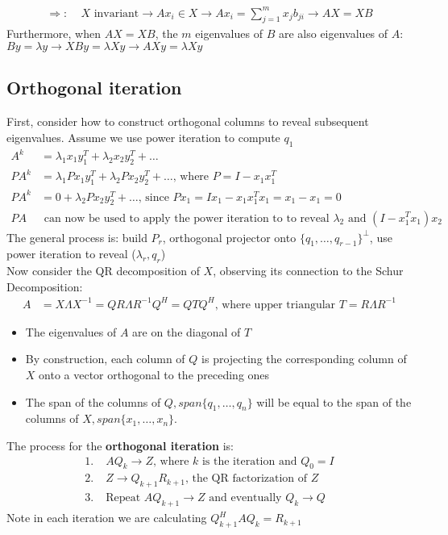 \documentclass{article}
\begin{document}
\begin{align*}
    \Rightarrow: \;& X \textrm{ invariant} \longrightarrow Ax_i \in X \longrightarrow Ax_i = \sum_{j=1}^mx_jb_{ji} \longrightarrow AX = XB
\end{align*}
Furthermore, when $AX = XB$, the $m$ eigenvalues of $B$ are also eigenvalues of $A$: $By = \lambda y \longrightarrow XBy = \lambda Xy \longrightarrow AXy = \lambda Xy$

\subsection{Orthogonal iteration}
First, consider how to construct orthogonal columns to reveal subsequent eigenvalues. Assume we use power iteration to compute $q_1$
\begin{align*}
    A^k &= \lambda_1x_1y_1^T + \lambda_2x_2y_2^T + \dots\\
    PA^k &= \lambda_1Px_1y_1^T + \lambda_2Px_2y_2^T + \dots \textrm{, where } P = I - x_1x_1^T\\
    PA^k &= 0 + \lambda_2Px_2y_2^T + \dots \textrm{, since } Px_1 = Ix_1 - x_1x_1^Tx_1 = x_1 - x_1 = 0\\
    PA &\textrm{ can now be used to apply the power iteration to to reveal $\lambda_2$ and } (I - x_1^Tx_1)x_2
\end{align*}
The general process is: build $P_r$, orthogonal projector onto  $\{q_1, \dots, q_{r-1}\}^\perp$, use power iteration to reveal ($\lambda_r, q_r$)\\
Now consider the QR decomposition of $X$, observing its connection to the Schur Decomposition:
\begin{align*}
    A &= X\Lambda X^{-1} = QR \Lambda R^{-1} Q^H = QTQ^H \textrm{, where upper triangular } T = R\Lambda R^{-1}
\end{align*}
\begin{itemize}
    \item The eigenvalues of $A$ are on the diagonal of $T$
    \item By construction, each column of $Q$ is projecting the corresponding column of $X$ onto a vector orthogonal to the preceding ones
    \item The span of the columns of $Q, span\{q_1, \dots, q_n\}$ will be equal to the span of the columns of $X, span\{x_1, \dots, x_n\}$.
\end{itemize}
The process for the \textbf{orthogonal iteration} is:
\begin{align*}
    1. \;& AQ_k \rightarrow Z \textrm{, where $k$ is the iteration and } Q_0 = I\\
    2. \;& Z \rightarrow Q_{k+1}R_{k+1} \textrm{, the QR factorization of $Z$}\\
    3. \;& \textrm{Repeat } AQ_{k+1} \rightarrow Z \textrm{ and eventually } Q_k \rightarrow Q
\end{align*}
Note in each iteration we are calculating $Q_{k+1}^HAQ_k = R_{k+1}$
\end{document}

